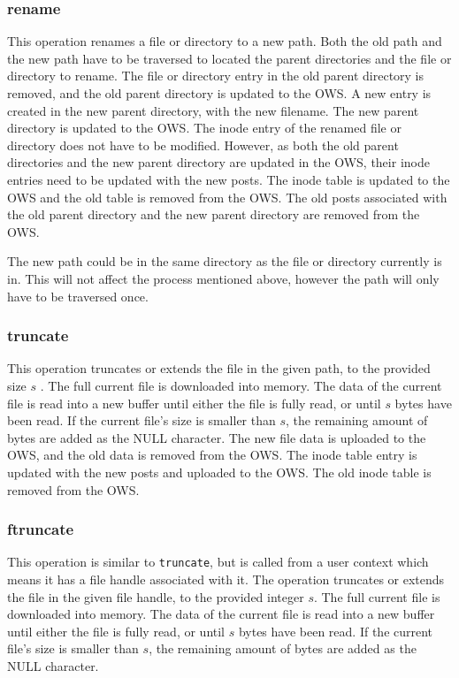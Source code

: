 \subsubsection{rename}
This operation renames a file or directory to a new path. Both the old path and the new path have to be traversed to located the parent directories and the file or directory to rename. The file or directory entry in the old parent directory is removed, and the old parent directory is updated to the OWS. A new entry is created in the new parent directory, with the new filename. The new parent directory is updated to the OWS. The inode entry of the renamed file or directory does not have to be modified. However, as both the old parent directories and the new parent directory are updated in the OWS, their inode entries need to be updated with the new posts. The inode table is updated to the OWS and the old table is removed from the OWS. The old posts associated with the old parent directory and the new parent directory are removed from the OWS.

The new path could be in the same directory as the file or directory currently is in. This will not affect the process mentioned above, however the path will only have to be traversed once.

\subsubsection{truncate}
This operation truncates or extends the file in the given path, to the provided size $s$ . The full current file is downloaded into memory. The data of the current file is read into a new buffer until either the file is fully read, or until $s$ bytes have been read. If the current file's size is smaller than $s$, the remaining amount of bytes are added as the NULL character. The new file data is uploaded to the OWS, and the old data is removed from the OWS. The inode table entry is updated with the new posts and uploaded to the OWS. The old inode table is removed from the OWS.

\subsubsection{ftruncate}
This operation is similar to \texttt{truncate}, but is called from a user context which means it has a file handle associated with it. The operation truncates or extends the file in the given file handle, to the provided integer $s$. The full current file is downloaded into memory. The data of the current file is read into a new buffer until either the file is fully read, or until $s$ bytes have been read. If the current file's size is smaller than $s$, the remaining amount of bytes are added as the NULL character.

